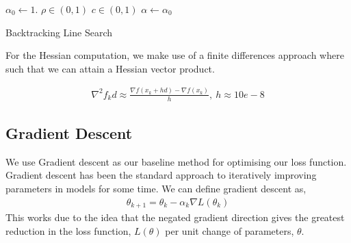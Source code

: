 \documentclass{article}
\begin{document}
\begin{algorithm}[H]
\SetAlgoLined
\KwResult{$\alpha$ }
 $\alpha_0 \gets 1.$\;
 $\rho \in (0,1)$\;
 $c \in (0,1)$\;
 $\alpha \gets \alpha_0$\;
 \caption{Backtracking Line Search}
\end{algorithm}

%
% 
 
 
For the Hessian computation, we make use of a finite differences approach where such that we can attain a Hessian vector product.

\begin{gather*}
\nabla^2 f_k d \approx \frac{\nabla f(x_k + hd) - \nabla f(x_k)}{h},\ h \approx 10e-8
\end{gather*}
\subsection{Gradient Descent}
We use Gradient descent as our baseline method for optimising our loss function.
Gradient descent has been the standard approach to iteratively improving parameters in models for some time. We can define gradient descent as,
\begin{gather*}
\theta_{k+1} = \theta_{k} - \alpha_k \nabla L(\theta_k)
\end{gather*}
This works due to the idea that the negated gradient direction gives the greatest reduction in the loss function, $L(\theta)$ per unit change of parameters, $\theta$.
\end{document}
